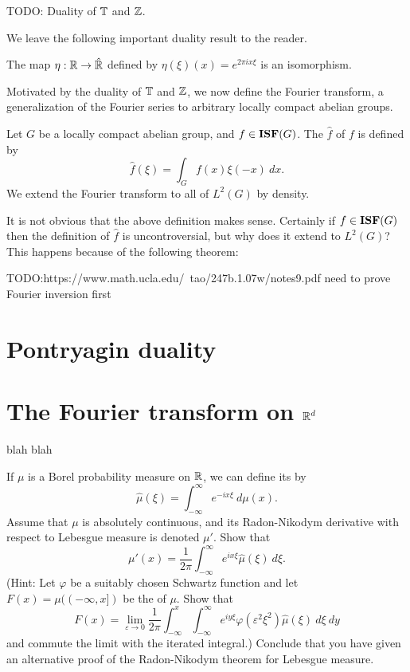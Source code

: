 \begin{example}
TODO: Duality of $\mathbb{T}$ and $\mathbb{Z}$.
\end{example}

We leave the following important duality result to the reader.
\begin{theorem}
The map $\eta: \mathbb{R} \to \hat {\mathbb{R}}$ defined by $\eta(\xi)(x) = e^{2\pi ix\xi}$ is an isomorphism.
\end{theorem}

Motivated by the duality of $\mathbb{T}$ and $\mathbb{Z}$, we now define the Fourier transform, a generalization of the Fourier series to arbitrary locally compact abelian groups.
\begin{definition}
Let $G$ be a locally compact abelian group, and $f \in \mathbf{ISF}(G)$. The  $\hat f$ of $f$ is defined by
\[\hat f(\xi) = \int_{G} f(x) \xi(-x)~dx.\]
We extend the Fourier transform to all of $L^2(G)$ by density.
\end{definition}
It is not obvious that the above definition makes sense. Certainly if $f \in \mathbf{ISF}(G)$ then the definition of $\hat f$ is uncontroversial, but why does it extend to $L^2(G)$?
This happens because of the following theorem:
\begin{theorem}[Plancherel]
TODO:https://www.math.ucla.edu/~tao/247b.1.07w/notes9.pdf
need to prove Fourier inversion first
\end{theorem}


\section{Pontryagin duality}

\section{The Fourier transform on $\mathbb{R}^d$}

blah blah

\begin{exercise}
If $\mu$ is a Borel probability measure on $\mathbb{R}$, we can define its  by
\[\hat \mu(\xi) = \int_{-\infty}^{\infty} e^{-ix\xi} ~d\mu(x).\]
Assume that $\mu$ is absolutely continuous, and its Radon-Nikodym derivative with respect to Lebesgue measure is denoted $\mu'$. Show that
\[\mu'(x) = \frac{1}{2\pi} \int_{-\infty}^{\infty} e^{ix\xi} \hat \mu(\xi)~d\xi.\]
(Hint: Let $\varphi$ be a suitably chosen Schwartz function and let $F(x) = \mu((-\infty, x])$ be the  of $\mu$. Show that
\[F(x) = \lim_{\varepsilon \to 0} \frac{1}{2\pi} \int_{-\infty}^{x} \int_{-\infty}^{\infty} e^{iy\xi} \varphi(\varepsilon^2 \xi^2) \hat \mu(\xi) ~d\xi ~dy\]
and commute the limit with the iterated integral.)
Conclude that you have given an alternative proof of the Radon-Nikodym theorem for Lebesgue measure.
\end{exercise}

